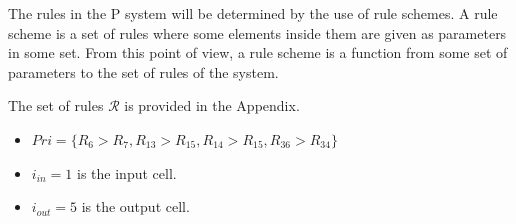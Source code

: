 \documentclass[journal]{IEEEtran}
\begin{document}
 The rules in the P system will be determined by the use of rule
schemes. A rule scheme is a set of rules where some elements inside
them are given as parameters in some set. From this point of view, a
rule scheme is a function from some set of parameters to the set of
rules of the system.

The set of rules $\mathcal{R}$ is provided in the Appendix.

\begin{itemize}
    \item $Pri = \{R_6 > R_7, R_{13} > R_{15}, R_{14} > R_{15}, R_{36} > R_{34}\} $
    \item $i_{in} = 1$ is the input cell.
    \item $i_{out} = 5$ is the output cell.
\end{itemize}
\end{document}
